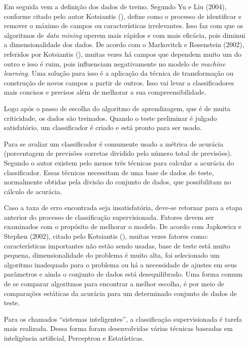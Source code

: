 Em seguida vem a definição dos dados de treino. Segundo Yu e Liu (2004), conforme citado pelo autor Kotsiantis (\citeyear{Kotsiantis}), define como o processo de identificar e remover o máximo de campos ou características irrelevantes. Isso faz com que os algoritmos de \textit{data mining} operem mais rápidos e com mais eficácia, pois diminui a dimensionalidade dos dados. De acordo com o Markovitch e Rosenstein (2002), referidos por Kotsiantis (\citeyear{Kotsiantis}), muitas vezes há campos que dependem muito um do outro e isso é ruim, pois influenciam negativamente no modelo de \textit{machine learning}. Uma solução para isso é a aplicação da técnica de transformação ou construção de novos campos a partir de outros. Isso vai levar a classificadores mais concisos e precisos além de melhorar a sua compreensibilidade.

Logo após o passo de escolha do algoritmo de aprendizagem, que é de muita criticidade, os dados são treinados. Quando o teste preliminar é julgado satisfatório, um classificador é criado e está pronto para ser usado.

Para se avaliar um classificador é comumente usado a métrica de acurácia (porcentagem de previsões corretas dividido pelo número total de previsões). Segundo o autor existem pelo menos três técnicas para calcular a acurácia do classificador. Essas técnicas necessitam de uma base de dados de teste, normalmente obtidas pela divisão do conjunto de dados, que possibilitam no cálculo de acurácia.

Caso a taxa de erro encontrada seja insatisfatória, deve-se retornar para a etapa anterior do processo de classificação supervisionada. Fatores devem ser examinados com o propósito de melhorar o modelo. De acordo com Japkowicz e Stephen (2002), citado pelo Kotsiantis (\citeyear{Kotsiantis}), muitas vezes fatores como: características importantes não estão sendo usadas, base de teste está muito pequena, dimensionalidade do problema é muito alta, foi selecionado um algoritmo inadequado para o problema ou há a necessidade de ajustes em seus parâmetros e ainda o conjunto de dados está desequilibrado. Uma forma comum de se comparar algoritmos para encontrar a melhor escolha, é por meio de comparações estáticas da acurácia para um determinado conjunto de dados de teste.

Para os chamados “sistemas inteligentes”, a classificação supervisionada é tarefa mais realizada. Dessa forma foram desenvolvidas várias técnicas baseadas em inteligência artificial, Perceptron e Estatísticas.
	
